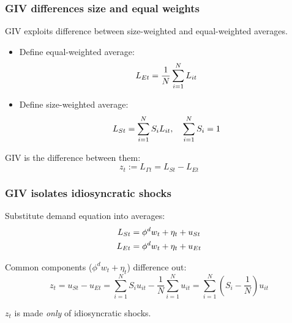 \documentclass[aspectratio=169,11pt]{beamer}
\begin{document}
\begin{frame}
    \frametitle{GIV differences size and equal weights}
    GIV exploits difference between size-weighted and equal-weighted averages. \\
    \vspace{0.2cm}
    \begin{itemize}
        \item Define equal-weighted average:
              \begin{equation*}
                  L_{Et} = \frac{1}{N} \sum_{i=1}^N L_{it} \notag
              \end{equation*}
        \item Define size-weighted average:
              \begin{equation*}
                  L_{St} = \sum_{i=1}^N S_i L_{it}, \quad \sum_{i=1}^N S_i = 1 \notag
              \end{equation*}
    \end{itemize}

    \vspace{0.5cm}
    GIV is the difference between them:
    \begin{equation}
        z_t := L_{\Gamma t} = L_{St} - L_{Et} \tag{GIV}
    \end{equation}

\end{frame}

\begin{frame} \label{src_equal_weighted}
    \frametitle{GIV isolates idiosyncratic shocks}

    \vspace{0.5cm}
    Substitute demand equation into averages: \hyperlink{app_size_weighted}{}
    \begin{align}
        L_{St} & = \phi^d w_t + \eta_t + u_{St} \notag \\
        L_{Et} & = \phi^d w_t + \eta_t + u_{Et} \notag
    \end{align}

    \vspace{0.5cm}
    Common components ($\phi^d w_t + \eta_t$) difference out:
    \begin{equation}
        z_t = u_{St} - u_{Et} = \sum_{i=1}^N S_i u_{it} - \frac{1}{N} \sum_{i=1}^N u_{it} = \sum_{i=1}^N (S_i - \frac{1}{N}) u_{it} \tag{GIV}
    \end{equation}

    \vspace{0.5cm}
    {\Large
        $z_t$ is made \emph{only} of idiosyncratic shocks.
    }

\end{frame}
\end{document}
